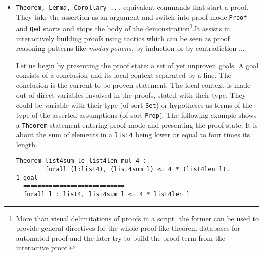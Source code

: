 \documentclass{article}
\begin{document}
\begin{itemize}
            \item \texttt{Theorem, Lemma, Corollary ...} equivalent commands that start a proof. They take the assertion as an argument and switch into proof mode.\texttt{Proof} and \texttt{Qed} starts and stops the body of the demonstration\footnote{More than visual delimitations of proofs in a script, the former can be used to provide general directives for the whole proof like theorem databases for automated proof and the later try to build the proof term from the interactive proof.}.It assists in interactively building proofs using tactics which can be seen as proof reasoning patterns like \textit{modus ponens}, by induction or by contradiction ...\par Let us begin by presenting the proof state: a set of yet unproven goals. A goal consists of a conclusion and its local context separated by a line. The conclusion is the current to-be-proven statement. The local context is made out of direct variables involved in the proofs, stated with their type. They could be variable with their type (of sort \texttt{Set}) or hypotheses as terms of the type of the asserted assumptions (of sort \texttt{Prop}). The following example shows a \texttt{Theorem} statement entering proof mode and presenting the proof state. It is about the sum of elements in a \texttt{list4} being lower or equal to four times its length.
            \begin{verbatim}Theorem list4sum_le_list4len_mul_4 : 
        forall (l:list4), (list4sum l) <= 4 * (list4len l).
1 goal
  ============================
  forall l : list4, list4sum l <= 4 * list4len l\end{verbatim}
            
        \end{itemize}
\end{document}
